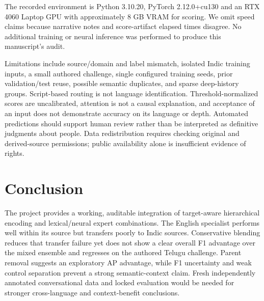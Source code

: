\documentclass[11pt,a4paper]{article}
\begin{document}
The recorded environment is Python 3.10.20, PyTorch 2.12.0+cu130 and an RTX 4060 Laptop GPU with approximately 8 GB VRAM for scoring. We omit speed claims because narrative notes and score-artifact elapsed times disagree. No additional training or neural inference was performed to produce this manuscript's audit.

Limitations include source/domain and label mismatch, isolated Indic training inputs, a small authored challenge, single configured training seeds, prior validation/test reuse, possible semantic duplicates, and sparse deep-history groups. Script-based routing is not language identification. Threshold-normalized scores are uncalibrated, attention is not a causal explanation, and acceptance of an input does not demonstrate accuracy on its language or depth. Automated predictions should support human review rather than be interpreted as definitive judgments about people. Data redistribution requires checking original and derived-source permissions; public availability alone is insufficient evidence of rights.

\section{Conclusion}
The project provides a working, auditable integration of target-aware hierarchical encoding and lexical/neural expert combinations. The English specialist performs well within its source but transfers poorly to Indic sources. Conservative blending reduces that transfer failure yet does not show a clear overall F1 advantage over the mixed ensemble and regresses on the authored Telugu challenge. Parent removal suggests an exploratory AP advantage, while F1 uncertainty and weak control separation prevent a strong semantic-context claim. Fresh independently annotated conversational data and locked evaluation would be needed for stronger cross-language and context-benefit conclusions.



\end{document}
